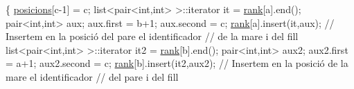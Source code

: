 \begin{DoxyCode}
\{
    \hyperlink{class_ranking_aaa3215582de4fcca82b9d8637584c12b}{posicions}[c-1] = c;
    list<pair<int,int> >::iterator it = \hyperlink{class_ranking_a1621d0167b2811762a9cb5bc7a520e66}{rank}[a].end();
    pair<int,int> aux;
    aux.first = b+1;
    aux.second = c;
    \hyperlink{class_ranking_a1621d0167b2811762a9cb5bc7a520e66}{rank}[a].insert(it,aux);                             \textcolor{comment}{// Insertem en la
       posició del pare el identificador}
                                                        \textcolor{comment}{// de la mare i del
       fill}
    list<pair<int,int> >::iterator it2 = \hyperlink{class_ranking_a1621d0167b2811762a9cb5bc7a520e66}{rank}[b].end();
    pair<int,int> aux2;
    aux2.first = a+1;
    aux2.second = c;
    \hyperlink{class_ranking_a1621d0167b2811762a9cb5bc7a520e66}{rank}[b].insert(it2,aux2);                           \textcolor{comment}{// Insertem en la
       posició de la mare el identificador}
                                                        \textcolor{comment}{// del pare i del fill}


\end{DoxyCode}
